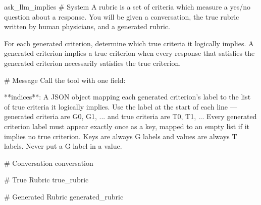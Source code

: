 \label{prompt:ask_llm_implies}
\begin{textbox}{ask\_llm\_implies}
# System
A rubric is a set of criteria which measure a yes/no question about a response. You will be given a conversation, the true rubric written by human physicians, and a generated rubric.

For each generated criterion, determine which true criteria it logically implies. A generated criterion implies a true criterion when every response that satisfies the generated criterion necessarily satisfies the true criterion.

# Message
Call the tool with one field:

**indices**: A JSON object mapping each generated criterion's label to the list of true criteria it logically implies. Use the label at the start of each line — generated criteria are G0, G1, ... and true criteria are T0, T1, ... Every generated criterion label must appear exactly once as a key, mapped to an empty list if it implies no true criterion. Keys are always G labels and values are always T labels. Never put a G label in a value.

# Conversation
{conversation}

# True Rubric
{true_rubric}

# Generated Rubric
{generated_rubric}
\end{textbox}
